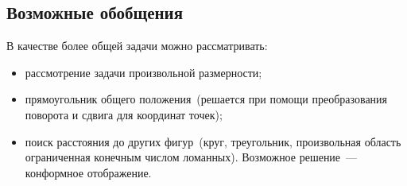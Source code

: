 \subsection{Возможные обобщения}
В качестве более общей задачи можно рассматривать:
\begin{itemize}
\item рассмотрение задачи произвольной размерности;
\item прямоугольник общего положения~(решается при помощи преобразования поворота и сдвига для координат точек);
\item поиск расстояния до других фигур~(круг, треугольник, произвольная область ограниченная конечным числом ломанных). Возможное решение~--- конформное отображение.
\end{itemize}

